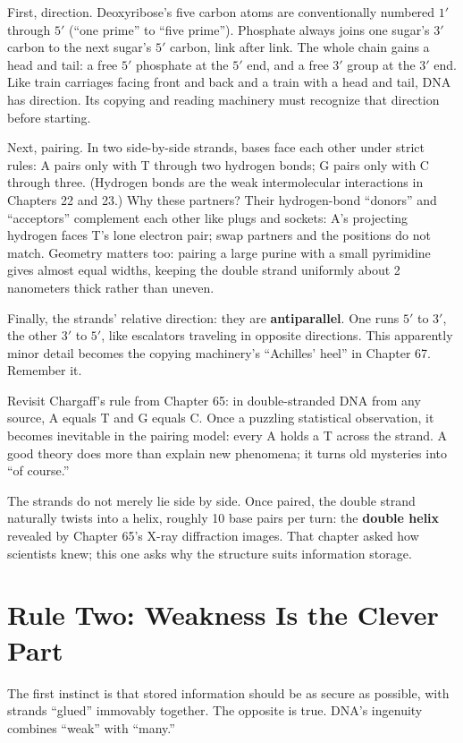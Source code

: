 First, direction. Deoxyribose's five carbon atoms are conventionally numbered $1'$ through $5'$ (``one prime'' to ``five prime''). Phosphate always joins one sugar's $3'$ carbon to the next sugar's $5'$ carbon, link after link. The whole chain gains a head and tail: a free $5'$ phosphate at the $5'$ end, and a free $3'$ group at the $3'$ end. Like train carriages facing front and back and a train with a head and tail, DNA has direction. Its copying and reading machinery must recognize that direction before starting.

Next, pairing. In two side-by-side strands, bases face each other under strict rules: A pairs only with T through two hydrogen bonds; G pairs only with C through three. (Hydrogen bonds are the weak intermolecular interactions in Chapters 22 and 23.) Why these partners? Their hydrogen-bond ``donors'' and ``acceptors'' complement each other like plugs and sockets: A's projecting hydrogen faces T's lone electron pair; swap partners and the positions do not match. Geometry matters too: pairing a large purine with a small pyrimidine gives almost equal widths, keeping the double strand uniformly about 2 nanometers thick rather than uneven.

Finally, the strands' relative direction: they are \textbf{antiparallel}. One runs $5'$ to $3'$, the other $3'$ to $5'$, like escalators traveling in opposite directions. This apparently minor detail becomes the copying machinery's ``Achilles' heel'' in Chapter 67. Remember it.

Revisit Chargaff's rule from Chapter 65: in double-stranded DNA from any source, A equals T and G equals C. Once a puzzling statistical observation, it becomes inevitable in the pairing model: every A holds a T across the strand. A good theory does more than explain new phenomena; it turns old mysteries into ``of course.''

The strands do not merely lie side by side. Once paired, the double strand naturally twists into a helix, roughly 10 base pairs per turn: the \textbf{double helix} revealed by Chapter 65's X-ray diffraction images. That chapter asked how scientists knew; this one asks why the structure suits information storage.

\section{Rule Two: Weakness Is the Clever Part}

The first instinct is that stored information should be as secure as possible, with strands ``glued'' immovably together. The opposite is true. DNA's ingenuity combines ``weak'' with ``many.''

